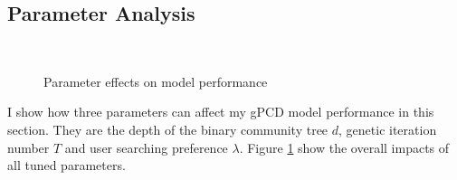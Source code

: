 \subsection{Parameter Analysis}  
\begin{figure}
	  \\
	\caption{Parameter effects on model performance}
	\label{fig:tuning}
\end{figure}
I show how three parameters can affect my gPCD model performance in this section. They are the depth of the binary community tree $d$, genetic iteration number $T$ and user searching preference $\lambda$. Figure \ref{fig:tuning} show the overall impacts of all tuned parameters.



